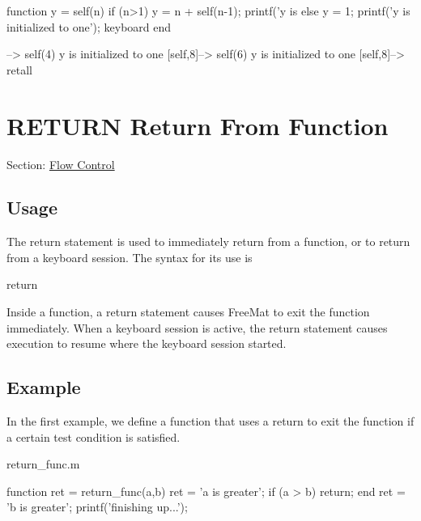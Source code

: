 \begin{DoxyVerbInclude}
function y = self(n)
  if (n>1)
    y = n + self(n-1);
    printf('y is %
  else
    y = 1;
    printf('y is initialized to one\n');
    keyboard
  end
\end{DoxyVerbInclude}



\begin{DoxyVerbInclude}
--> self(4)
y is initialized to one
[self,8]--> self(6)
y is initialized to one
[self,8]--> retall
\end{DoxyVerbInclude}
 \hypertarget{flow_return}{}\section{R\-E\-T\-U\-R\-N Return From Function}\label{flow_return}
Section\-: \hyperlink{sec_flow}{Flow Control} \hypertarget{vtkwidgets_vtkxyplotwidget_Usage}{}\subsection{Usage}\label{vtkwidgets_vtkxyplotwidget_Usage}
The {\ttfamily return} statement is used to immediately return from a function, or to return from a {\ttfamily keyboard} session. The syntax for its use is \begin{DoxyVerb}  return
\end{DoxyVerb}
 Inside a function, a {\ttfamily return} statement causes Free\-Mat to exit the function immediately. When a {\ttfamily keyboard} session is active, the {\ttfamily return} statement causes execution to resume where the {\ttfamily keyboard} session started. \hypertarget{variables_struct_Example}{}\subsection{Example}\label{variables_struct_Example}
In the first example, we define a function that uses a {\ttfamily return} to exit the function if a certain test condition is satisfied.

\begin{DoxyVerb}     return_func.m
\end{DoxyVerb}



\begin{DoxyVerbInclude}
function ret = return_func(a,b)
  ret = 'a is greater';
  if (a > b)
    return;
  end
  ret = 'b is greater';
  printf('finishing up...\n');
\end{DoxyVerbInclude}


